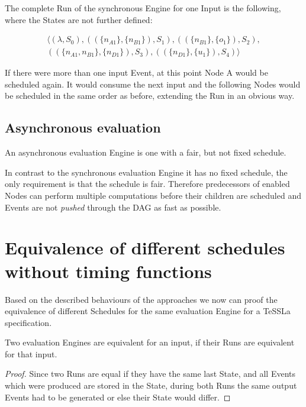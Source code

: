 The complete Run of the synchronous Engine for one Input is the following, where the States are not further defined:

\begin{align*}
  \langle
    (\lambda,                             S_0),
    ((\{ n_{A1}         \}, \{n_{B1}\}),  S_1),
    ((\{ n_{B1}         \}, \{o_1\}),     S_2),\\
    ((\{ n_{A1}, n_{B1} \}, \{n_{D1}\}),  S_3),
    ((\{ n_{D1}         \}, \{u_1\}),     S_4)
  \rangle
\end{align*}

If there were more than one input Event, at this point Node A would be scheduled again.
It would consume the next input and the following Nodes would be scheduled in the same order as before, extending the Run in an obvious way.

\subsection{Asynchronous evaluation}
\label{sec:concepts:behaviour_without_timing:async}

An asynchronous evaluation Engine is one with a fair, but not fixed schedule.

In contrast to the synchronous evaluation Engine it has no fixed schedule, the only requirement is that the schedule is fair.
Therefore predecessors of enabled Nodes can perform multiple computations before their children are scheduled and Events are not \emph{pushed} through the DAG as fast as possible.

\section{Equivalence of different schedules without timing functions}
\label{sec:concepts:equivalence_without_timing}

Based on the described behaviours of the approaches we now can proof the equivalence of different Schedules for the same evaluation Engine for a TeSSLa specification.

\begin{lemma}[name = Equivalence of Engines for one Input]\label{lemma:eval_equivalent_if_runs_equal}
  Two evaluation Engines are equivalent for an input, if their Runs are equivalent for that input.
\end{lemma}

\begin{proof}
  Since two Runs are equal if they have the same last State, and all Events which were produced are stored in the State, during both Runs the same output Events had to be generated or else their State would differ.
\end{proof}

